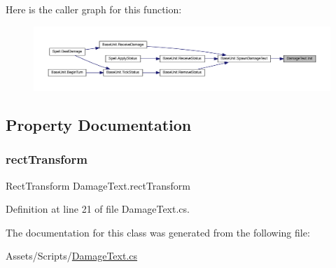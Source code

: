 Here is the caller graph for this function\+:
\nopagebreak
\begin{figure}[H]
\begin{center}
\leavevmode
\includegraphics[width=350pt]{class_damage_text_ab66ed998f41cdeb84c22449950170f67_icgraph}
\end{center}
\end{figure}


\subsection{Property Documentation}
\mbox{\label{class_damage_text_ae6860819b6715004f9f05314039aa978}} 
\subsubsection{\texorpdfstring{rectTransform}{rectTransform}}
{\footnotesize\ttfamily Rect\+Transform Damage\+Text.\+rect\+Transform\hspace{0.3cm}{\ttfamily [get]}}



Definition at line 21 of file Damage\+Text.\+cs.



The documentation for this class was generated from the following file\+:\begin{DoxyCompactItemize}
\item 
Assets/\+Scripts/\mbox{\hyperlink{_damage_text_8cs}{Damage\+Text.\+cs}}\end{DoxyCompactItemize}
